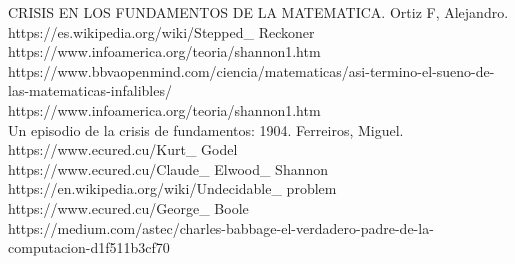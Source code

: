 \documentclass{letter}
\begin{document}
CRISIS EN LOS FUNDAMENTOS DE LA MATEMATICA.    Ortiz F, Alejandro. \\
https://es.wikipedia.org/wiki/Stepped\_ Reckoner\\
https://www.infoamerica.org/teoria/shannon1.htm\\
https://www.bbvaopenmind.com/ciencia/matematicas/asi-termino-el-sueno-de-las-matematicas-infalibles/\\
https://www.infoamerica.org/teoria/shannon1.htm\\
Un episodio de la crisis de fundamentos: 1904.      Ferreiros, Miguel.\\
https://www.ecured.cu/Kurt\_ Godel\\
https://www.ecured.cu/Claude\_ Elwood\_ Shannon
https://en.wikipedia.org/wiki/Undecidable\_ problem\\
https://www.ecured.cu/George\_ Boole\\
https://medium.com/astec/charles-babbage-el-verdadero-padre-de-la-computacion-d1f511b3cf70
\end{document}
